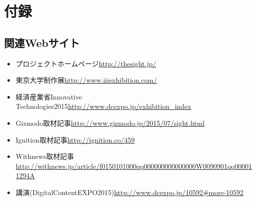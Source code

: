 \section{付録}	

\subsection{関連Webサイト}
\begin{itemize}
\item プロジェクトホームページ\url{http://thesight.jp/}
\item 東京大学制作展\url{http://www.iiiexhibition.com/}
\item 経済産業省Innovative Technologies2015\url{http://www.dcexpo.jp/exhibition_index}
\item Gizmodo取材記事\url{http://www.gizmodo.jp/2015/07/sight.html}
\item Ignition取材記事\url{http://ignition.co/459}
\item Withnews取材記事\url{http://withnews.jp/article/f0150101000qq000000000000000W0090901qq000011294A}
\item 講演(DigitalContentEXPO2015)\url{http://www.dcexpo.jp/10592#more-10592}
\end{itemize}
